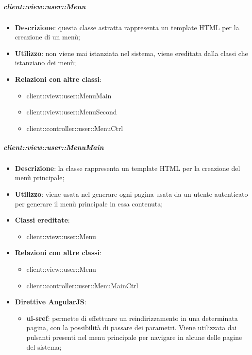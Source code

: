		\subparagraph{client::view::user::Menu} %
		\label{subp:bdsm_app_client_view_user_menu}
			\begin{itemize}
				\item \textbf{Descrizione}: questa classe astratta rappresenta un template HTML per la creazione di un menù;
				\item \textbf{Utilizzo}: non viene mai istanziata nel sistema, viene ereditata dalla classi che istanziano dei menù;
				\item \textbf{Relazioni con altre classi}:
					\begin{itemize}
						\item client::view::user::MenuMain
						\item client::view::user::MenuSecond
						\item client::controller::user::MenuCtrl
					\end{itemize}
			\end{itemize}

		\subparagraph{client::view::user::MenuMain} %
		\label{subp:bdsm_app_client_view_user_menumain}

			\begin{itemize}
				\item \textbf{Descrizione}: la classe rappresenta un template HTML per la creazione del menù principale;
				\item \textbf{Utilizzo}: viene usata nel generare ogni pagina usata da un utente autenticato per generare il menù principale in essa contenuta;
				\item \textbf{Classi ereditate}:
					\begin{itemize}
						\item client::view::user::Menu
					\end{itemize}
				\item \textbf{Relazioni con altre classi}:
					\begin{itemize}
						\item client::view::user::Menu
						\item client::controller::user::MenuMainCtrl
					\end{itemize}
				\item \textbf{Direttive AngularJS}:
					\begin{itemize}
						\item \textbf{ui-sref}: permette di effettuare un reindirizzamento in una determinata pagina, con la possibilità di passare dei parametri. Viene utilizzata dai pulsanti presenti nel menu principale per navigare in alcune delle pagine del sistema;
					\end{itemize}
			\end{itemize}

